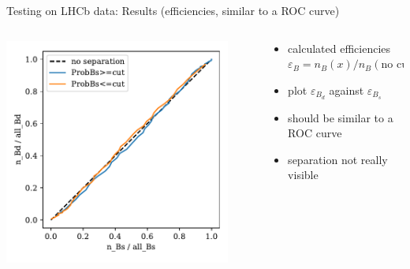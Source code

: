\documentclass[aspectratio=1610, 10pt]{beamer}
\begin{document}
\begin{frame}{Testing on LHCb data: Results (efficiencies, similar to a ROC curve)}
  \begin{columns}
    \begin{column}{0.5\textwidth}
      \centering
      \includegraphics[width=0.9\textwidth]{images/data_roc.pdf}
    \end{column}
    \begin{column}{0.5\textwidth}
      \begin{itemize}
        \item calculated efficiencies $\varepsilon_B = n_B(x)/n_B(\text{no cut})$
        \item plot $\varepsilon_{B_d}$ against $\varepsilon_{B_s}$
        \item should be similar to a ROC curve
        \item separation not really visible
      \end{itemize}
    \end{column}
  \end{columns}
\end{frame}
\end{document}
